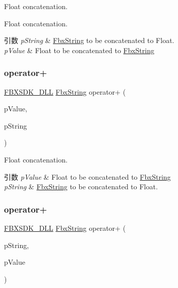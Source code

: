 Float concatenation. 

Float concatenation. 
\begin{DoxyParams}{引数}
{\em p\+String} & \hyperlink{class_fbx_string}{Fbx\+String} to be concatenated to Float. \\
\hline
{\em p\+Value} & Float to be concatenated to \hyperlink{class_fbx_string}{Fbx\+String} \\
\hline
\end{DoxyParams}
\mbox{\label{class_fbx_string_ad24f53b332e3ad680ee80783e39fd554}} 
\subsubsection{\texorpdfstring{operator+}{operator+}\hspace{0.1cm}{\footnotesize\ttfamily [9/10]}}
{\footnotesize\ttfamily \hyperlink{fbxarch_8h_a25d1298b33c31da5dbed969e0d4b4bc1}{F\+B\+X\+S\+D\+K\+\_\+\+D\+LL} \hyperlink{class_fbx_string}{Fbx\+String} operator+ (\begin{DoxyParamCaption}\item[{float}]{p\+Value,  }\item[{const \hyperlink{class_fbx_string}{Fbx\+String} \&}]{p\+String }\end{DoxyParamCaption})\hspace{0.3cm}{\ttfamily [friend]}}

Float concatenation. 
\begin{DoxyParams}{引数}
{\em p\+Value} & Float to be concatenated to \hyperlink{class_fbx_string}{Fbx\+String} \\
\hline
{\em p\+String} & \hyperlink{class_fbx_string}{Fbx\+String} to be concatenated to Float. \\
\hline
\end{DoxyParams}
\mbox{\label{class_fbx_string_a358d5e7bed17720e4310db397dbcbf53}} 
\subsubsection{\texorpdfstring{operator+}{operator+}\hspace{0.1cm}{\footnotesize\ttfamily [10/10]}}
{\footnotesize\ttfamily \hyperlink{fbxarch_8h_a25d1298b33c31da5dbed969e0d4b4bc1}{F\+B\+X\+S\+D\+K\+\_\+\+D\+LL} \hyperlink{class_fbx_string}{Fbx\+String} operator+ (\begin{DoxyParamCaption}\item[{const \hyperlink{class_fbx_string}{Fbx\+String} \&}]{p\+String,  }\item[{double}]{p\+Value }\end{DoxyParamCaption})\hspace{0.3cm}{\ttfamily [friend]}}




